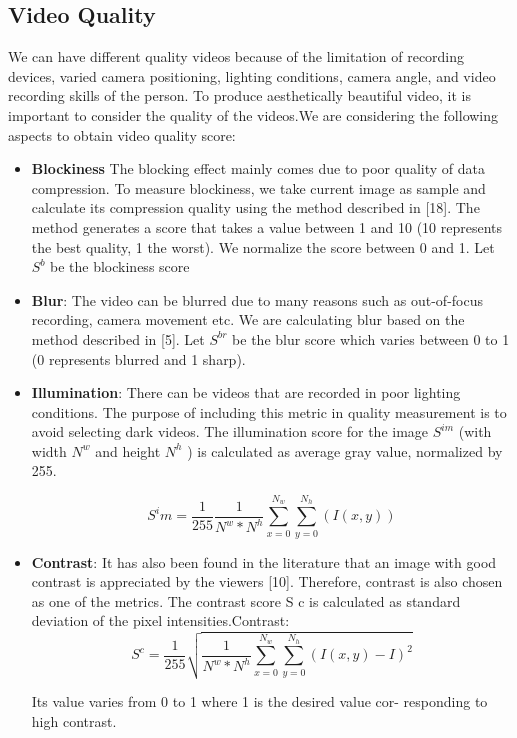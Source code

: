 \documentclass{sig-alternate}
\begin{document}
\subsection{Video Quality}
We can have different quality videos because of the limitation of
recording devices, varied camera positioning, lighting conditions,
camera angle, and video recording skills of the person. To produce
aesthetically beautiful video, it is important to consider the quality
of the videos.We are considering the following aspects to obtain
video quality score:

\begin{itemize}
    \item \textbf{Blockiness} The blocking effect mainly comes due to poor
quality of data compression. To measure blockiness, we take
current image as sample and calculate its compression quality using the method described in [18]. The method generates
a score that takes a value between 1 and 10 (10 represents the
best quality, 1 the worst). We normalize the score between 0
and 1. Let $S^b$ be the blockiness score

\item \textbf{Blur}: The video can be blurred due to many reasons such as
out-of-focus recording, camera movement etc. We are calculating blur based on the method described in [5]. Let $S^{br}$
be the blur score which varies between 0 to 1 (0 represents
blurred and 1 sharp).

\item  \textbf {Illumination}: There can be videos that are recorded in poor
lighting conditions. The purpose of including this metric in
quality measurement is to avoid selecting dark videos. The
illumination score for the image $S^{im}$ (with width $N^{w}$ and
height $N^{h}$ ) is calculated as average gray value, normalized
by 255.

$$S^im= \frac{1}{255} \frac{1}{N^w * N^h}  \sum_{x=0}^{N_w} \sum_{y=0}^{N_h} (I(x,y))$$


\item  \textbf{Contrast}: It has also been found in the literature that an image with good contrast is appreciated by the viewers [10].
Therefore, contrast is also chosen as one of the metrics. The
contrast score S c is calculated as standard deviation of the
pixel intensities.Contrast:\\
$$S^c= \frac{1}{255} \sqrt{ \frac{1}{N^w * N^h}  \sum_{x=0}^{N_w} \sum_{y=0}^{N_h} (I(x,y)-I)^2}$$
\sum
    
    Its value varies from 0 to 1 where 1 is the desired value cor-
responding to high contrast.


\end{itemize}
\end{document}
